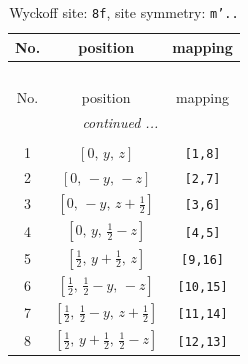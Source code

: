 \documentclass[fleqn,8pt]{jsarticle}
\begin{document}
\begin{longtable}{ccc}
\caption{Wyckoff site: {\tt 8f}, site symmetry: {\tt m'..}}
 \\
 \hline \hline
No. & position & mapping \\ \hline \endfirsthead

\multicolumn{2}{l}{\tablename\ \thetable{}} \\
 \hline \hline
No. & position & mapping \\ \hline \endhead

 \hline \hline
\multicolumn{2}{r}{\footnotesize\it continued ...} \\ \endfoot

 \hline \hline
\multicolumn{2}{r}{} \\ \endlastfoot

1 & $\left[ 0,\, y,\, z \right]$ & {\tt [1,8]} \\ \hline
2 & $\left[ 0,\, - y,\, - z \right]$ & {\tt [2,7]} \\ \hline
3 & $\left[ 0,\, - y,\, z + \frac{1}{2} \right]$ & {\tt [3,6]} \\ \hline
4 & $\left[ 0,\, y,\, \frac{1}{2} - z \right]$ & {\tt [4,5]} \\ \hline
5 & $\left[ \frac{1}{2},\, y + \frac{1}{2},\, z \right]$ & {\tt [9,16]} \\ \hline
6 & $\left[ \frac{1}{2},\, \frac{1}{2} - y,\, - z \right]$ & {\tt [10,15]} \\ \hline
7 & $\left[ \frac{1}{2},\, \frac{1}{2} - y,\, z + \frac{1}{2} \right]$ & {\tt [11,14]} \\ \hline
8 & $\left[ \frac{1}{2},\, y + \frac{1}{2},\, \frac{1}{2} - z \right]$ & {\tt [12,13]} \\
\end{longtable}
\renewcommand{\arraystretch}{1.2}
\end{document}
